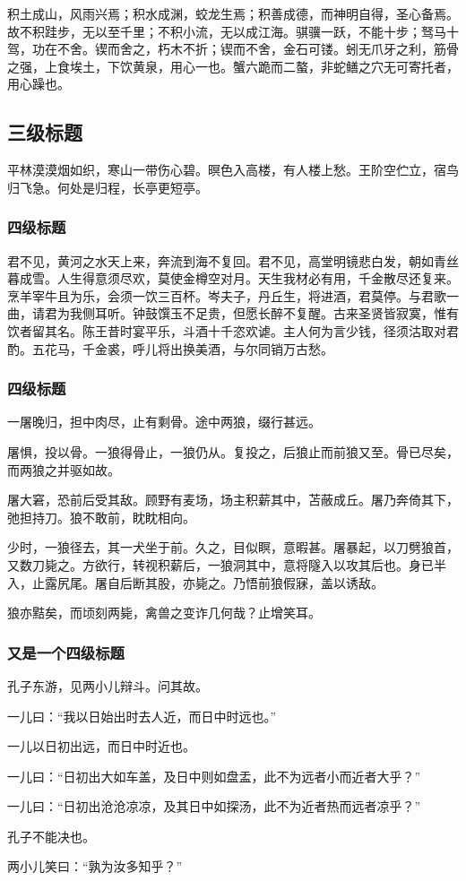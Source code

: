         积土成山，风雨兴焉；积水成渊，蛟龙生焉；积善成德，而神明自得，圣心备焉。故不积跬步，无以至千里；不积小流，无以成江海。骐骥一跃，不能十步；驽马十驾，功在不舍。锲而舍之，朽木不折；锲而不舍，金石可镂。蚓无爪牙之利，筋骨之强，上食埃土，下饮黄泉，用心一也。蟹六跪而二螯，非蛇鳝之穴无可寄托者，用心躁也。
         

        \subsection{三级标题}

        平林漠漠烟如织，寒山一带伤心碧。暝色入高楼，有人楼上愁。王阶空伫立，宿鸟归飞急。何处是归程，长亭更短亭。


            \subsubsection{四级标题}
                
            君不见，黄河之水天上来，奔流到海不复回。君不见，高堂明镜悲白发，朝如青丝暮成雪。人生得意须尽欢，莫使金樽空对月。天生我材必有用，千金散尽还复来。烹羊宰牛且为乐，会须一饮三百杯。岑夫子，丹丘生，将进酒，君莫停。与君歌一曲，请君为我侧耳听。钟鼓馔玉不足贵，但愿长醉不复醒。古来圣贤皆寂寞，惟有饮者留其名。陈王昔时宴平乐，斗酒十千恣欢谑。主人何为言少钱，径须沽取对君酌。五花马，千金裘，呼儿将出换美酒，与尔同销万古愁。

            \subsubsection{四级标题}

                一屠晚归，担中肉尽，止有剩骨。途中两狼，缀行甚远。

                屠惧，投以骨。一狼得骨止，一狼仍从。复投之，后狼止而前狼又至。骨已尽矣，而两狼之并驱如故。

                屠大窘，恐前后受其敌。顾野有麦场，场主积薪其中，苫蔽成丘。屠乃奔倚其下，弛担持刀。狼不敢前，眈眈相向。

                少时，一狼径去，其一犬坐于前。久之，目似瞑，意暇甚。屠暴起，以刀劈狼首，又数刀毙之。方欲行，转视积薪后，一狼洞其中，意将隧入以攻其后也。身已半入，止露尻尾。屠自后断其股，亦毙之。乃悟前狼假寐，盖以诱敌。

                狼亦黠矣，而顷刻两毙，禽兽之变诈几何哉？止增笑耳。

            \subsubsection{又是一个四级标题}

                孔子东游，见两小儿辩斗。问其故。

                一儿曰：“我以日始出时去人近，而日中时远也。”

                一儿以日初出远，而日中时近也。

                一儿曰：“日初出大如车盖，及日中则如盘盂，此不为远者小而近者大乎？”

                一儿曰：“日初出沧沧凉凉，及其日中如探汤，此不为近者热而远者凉乎？”

                孔子不能决也。

                两小儿笑曰：“孰为汝多知乎？”

